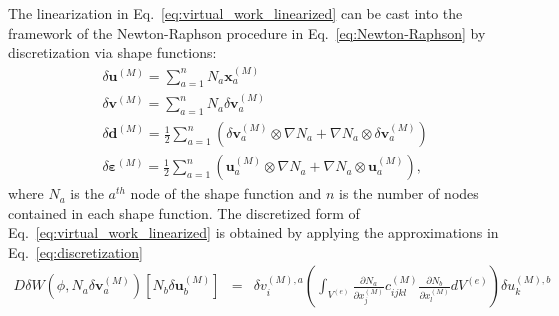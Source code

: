 The linearization in Eq.\ \eqref{eq:virtual_work_linearized} can be cast into the framework of the Newton-Raphson procedure in Eq.\ \eqref{eq:Newton-Raphson} by discretization via shape functions:
%
\begin{align}
&\delta \pmb{u}^{(M)} = \sum_{a=1}^n N_a \pmb{x}_a^{(M)} \nonumber\\
%
&\delta \pmb{v}^{(M)} = \sum_{a=1}^n N_a \delta \pmb{v}_a^{(M)} \nonumber\\
%
&\delta \pmb{d}^{(M)} = \frac{1}{2} \sum_{a=1}^n (\delta \pmb{v}_a^{(M)} \otimes \nabla N_a + \nabla N_a \otimes \delta \pmb{v}_a^{(M)}) \nonumber\\
%
&\delta \pmb{\varepsilon}^{(M)} = \frac{1}{2} \sum_{a=1}^n (\pmb{u}_a^{(M)} \otimes \nabla N_a + \nabla N_a \otimes \pmb{u}_a^{(M)}),
\label{eq:discretization}
\end{align}
%
where $N_a$ is the $a^{th}$ node of the shape function and $n$ is the number of nodes contained in each shape function. The discretized form of Eq.\ \eqref{eq:virtual_work_linearized} is obtained by applying the approximations in Eq.\ \eqref{eq:discretization}
%
\begin{eqnarray}
D\delta W(\phi,N_a\delta \pmb{v}_a^{(M)})[N_b\delta \pmb{u}_b^{(M)}] &=& \delta v_i^{(M),a}\left(\int_{V^{(e)}}\frac{\partial N_a}{\partial x_j^{(M)}} c_{ijkl}^{(M)} \frac{\partial N_b}{\partial x_l^{(M)}} dV^{(e)} \right) \delta u_k^{(M),b} 
\end{eqnarray}
%

